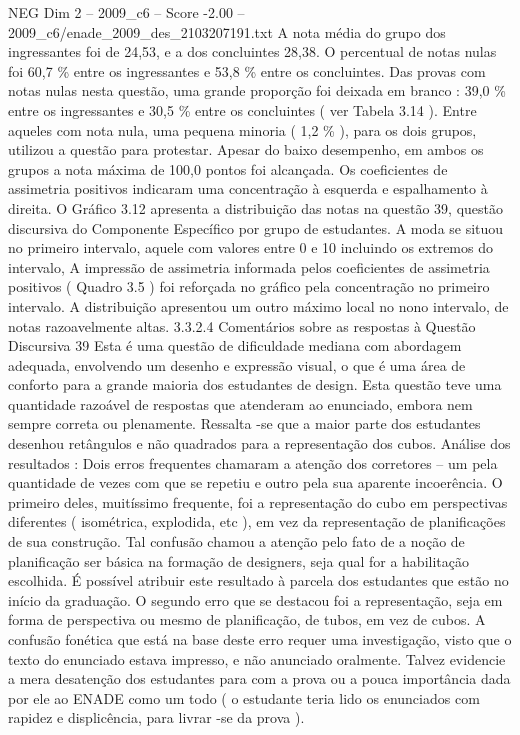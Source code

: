 \begin{textsample}{NEG Dim 2 – 2009\_c6 – Score -2.00 – 2009\_c6/enade\_2009\_des\_2103207191.txt}
A nota média do grupo dos ingressantes foi de 24,53, e a dos concluintes 28,38.
O percentual de notas nulas foi 60,7 \% entre os ingressantes e 53,8 \% entre os concluintes.
Das provas com notas nulas nesta questão, uma grande proporção foi deixada em branco : 39,0 \% entre os ingressantes e 30,5 \% entre os concluintes ( ver Tabela 3.14 ).
Entre aqueles com nota nula, uma pequena minoria ( 1,2 \% ), para os dois grupos, utilizou a questão para protestar.
Apesar do baixo desempenho, em ambos os grupos a nota máxima de 100,0 pontos foi alcançada.
Os coeficientes de assimetria positivos indicaram uma concentração à esquerda e espalhamento à direita.
O Gráfico 3.12 apresenta a distribuição das notas na questão 39, questão discursiva do Componente Específico por grupo de estudantes.
A moda se situou no primeiro intervalo, aquele com valores entre 0 e 10 incluindo os extremos do intervalo, A impressão de assimetria informada pelos coeficientes de assimetria positivos ( Quadro 3.5 ) foi reforçada no gráfico pela concentração no primeiro intervalo.
A distribuição apresentou um outro máximo local no nono intervalo, de notas razoavelmente altas. 3.3.2.4 Comentários sobre as respostas à Questão Discursiva 39 Esta é uma questão de dificuldade mediana com abordagem adequada, envolvendo um desenho e expressão visual, o que é uma área de conforto para a grande maioria dos estudantes de design.
Esta questão teve uma quantidade razoável de respostas que atenderam ao enunciado, embora nem sempre correta ou plenamente.
Ressalta -se que a maior parte dos estudantes desenhou retângulos e não quadrados para a representação dos cubos.
Análise dos resultados : Dois erros frequentes chamaram a atenção dos corretores – um pela quantidade de vezes com que se repetiu e outro pela sua aparente incoerência.
O primeiro deles, muitíssimo frequente, foi a representação do cubo em perspectivas diferentes ( isométrica, explodida, etc ), em vez da representação de planificações de sua construção.
Tal confusão chamou a atenção pelo fato de a noção de planificação ser básica na formação de designers, seja qual for a habilitação escolhida.
É possível atribuir este resultado à parcela dos estudantes que estão no início da graduação.
O segundo erro que se destacou foi a representação, seja em forma de perspectiva ou mesmo de planificação, de tubos, em vez de cubos.
A confusão fonética que está na base deste erro requer uma investigação, visto que o texto do enunciado estava impresso, e não anunciado oralmente.
Talvez evidencie a mera desatenção dos estudantes para com a prova ou a pouca importância dada por ele ao ENADE como um todo ( o estudante teria lido os enunciados com rapidez e displicência, para livrar -se da prova ).

\end{textsample}
